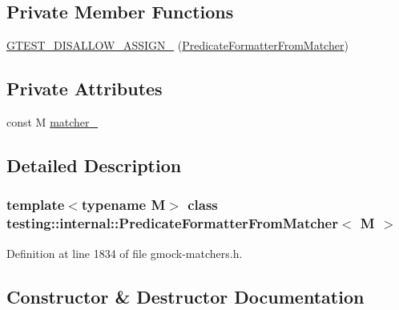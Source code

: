 \subsection*{Private Member Functions}
\begin{DoxyCompactItemize}
\item 
\hyperlink{classtesting_1_1internal_1_1PredicateFormatterFromMatcher_adf90dc6428d22a7fce463606d495ee9c}{G\+T\+E\+S\+T\+\_\+\+D\+I\+S\+A\+L\+L\+O\+W\+\_\+\+A\+S\+S\+I\+G\+N\+\_\+} (\hyperlink{classtesting_1_1internal_1_1PredicateFormatterFromMatcher}{Predicate\+Formatter\+From\+Matcher})
\end{DoxyCompactItemize}
\subsection*{Private Attributes}
\begin{DoxyCompactItemize}
\item 
const M \hyperlink{classtesting_1_1internal_1_1PredicateFormatterFromMatcher_a487a5e8a5f082947d060b1e07112b38d}{matcher\+\_\+}
\end{DoxyCompactItemize}


\subsection{Detailed Description}
\subsubsection*{template$<$typename M$>$\newline
class testing\+::internal\+::\+Predicate\+Formatter\+From\+Matcher$<$ M $>$}



Definition at line 1834 of file gmock-\/matchers.\+h.



\subsection{Constructor \& Destructor Documentation}
\mbox{\label{classtesting_1_1internal_1_1PredicateFormatterFromMatcher_aa0c40eca009c31e25738520dea0bc98c}} 
